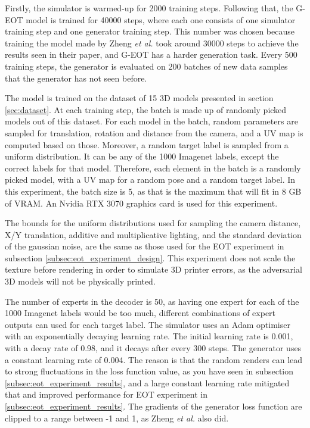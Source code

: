 Firstly, the simulator is warmed-up for 2000 training steps. Following that, the G-EOT model is trained for 40000 steps, where each one consists of one simulator training step and one generator training step. This number was chosen because training the model made by Zheng \textit{et al.} \cite{zheng_black_box_GAN} took around 30000 steps to achieve the results seen in their paper, and G-EOT has a harder generation task. Every 500 training steps, the generator is evaluated on 200 batches of new data samples that the generator has not seen before.

The model is trained on the dataset of 15 3D models presented in section \ref{sec:dataset}. At each training step, the batch is made up of randomly picked models out of this dataset. For each model in the batch, random parameters are sampled for translation, rotation and distance from the camera, and a UV map is computed based on those. Moreover, a random target label is sampled from a uniform distribution. It can be any of the 1000 Imagenet labels, except the correct labels for that model. Therefore, each element in the batch is a randomly picked model, with a UV map for a random pose and a random target label. In this experiment, the batch size is 5, as that is the maximum that will fit in 8 GB of VRAM. An Nvidia RTX 3070 graphics card is used for this experiment.

The bounds for the uniform distributions used for sampling the camera distance, X/Y translation, additive and multiplicative lighting, and the standard deviation of the gaussian noise, are the same as those used for the EOT experiment in subsection \ref{subsec:eot_experiment_design}. This experiment does not scale the texture before rendering in order to simulate 3D printer errors, as the adversarial 3D models will not be physically printed.

The number of experts in the decoder is 50, as having one expert for each of the 1000 Imagenet labels would be too much, different combinations of expert outputs can used for each target label. The simulator uses an Adam optimiser with an exponentially decaying learning rate. The initial learning rate is 0.001, with a decay rate of 0.98, and it decays after every 300 steps. The generator uses a constant learning rate of 0.004. The reason is that the random renders can lead to strong fluctuations in the loss function value, as you have seen in subsection \ref{subsec:eot_experiment_results}, and a large constant learning rate mitigated that and improved performance for EOT experiment in \ref{subsec:eot_experiment_results}. The gradients of the generator loss function are clipped to a range between -1 and 1, as Zheng \textit{et al.} \cite{zheng_black_box_GAN} also did.

